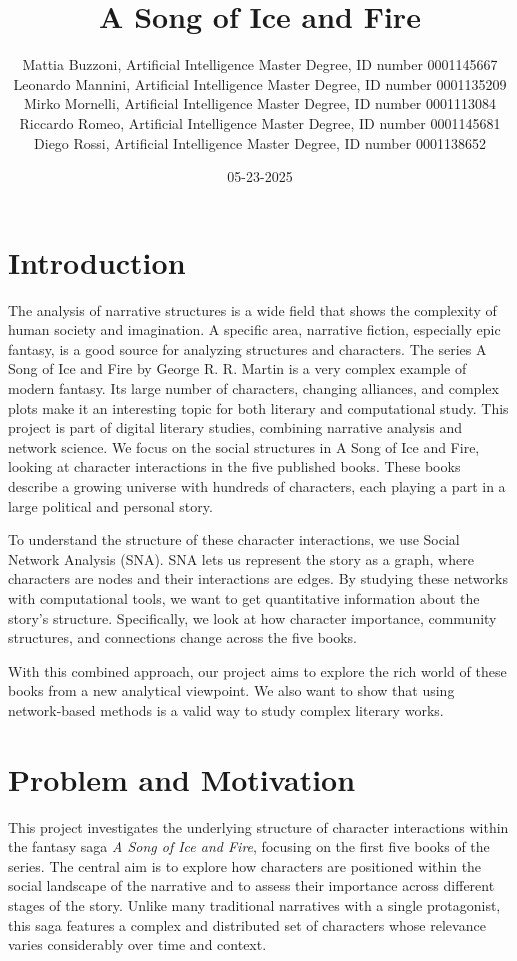 \documentclass[12pt, a4paper]{article}
\author{Mattia Buzzoni, Artificial Intelligence Master Degree, ID number 0001145667
\\Leonardo Mannini, Artificial Intelligence Master Degree, ID number 0001135209
\\Mirko Mornelli, Artificial Intelligence Master Degree, ID number 0001113084
\\Riccardo Romeo, Artificial Intelligence Master Degree, ID number 0001145681
\\Diego Rossi, Artificial Intelligence Master Degree, ID number 0001138652}
\date{05-23-2025}
\title{A Song of Ice and Fire}
\begin{document}
\maketitle

\section{Introduction}
\label{introduction}
The analysis of narrative structures is a wide field that shows the complexity of human society and imagination. A specific area, narrative fiction, especially epic fantasy, is a good source for analyzing structures and characters. The series A Song of Ice and Fire by George R. R. Martin is a very complex example of modern fantasy. Its large number of characters, changing alliances, and complex plots make it an interesting topic for both literary and computational study.
This project is part of digital literary studies, combining narrative analysis and network science. We focus on the social structures in A Song of Ice and Fire, looking at character interactions in the five published books. These books describe a growing universe with hundreds of characters, each playing a part in a large political and personal story.

To understand the structure of these character interactions, we use Social Network Analysis (SNA). SNA lets us represent the story as a graph, where characters are nodes and their interactions are edges. By studying these networks with computational tools, we want to get quantitative information about the story's structure. Specifically, we look at how character importance, community structures, and connections change across the five books.

With this combined approach, our project aims to explore the rich world of these books from a new analytical viewpoint. We also want to show that using network-based methods is a valid way to study complex literary works.

\section{Problem and Motivation}
\label{problem-and-motivation}

This project investigates the underlying structure of character interactions within the fantasy saga \textit{A Song of Ice and Fire}, focusing on the first five books of the series. The central aim is to explore how characters are positioned within the social landscape of the narrative and to assess their importance across different stages of the story. Unlike many traditional narratives with a single protagonist, this saga features a complex and distributed set of characters whose relevance varies considerably over time and context.
\end{document}
